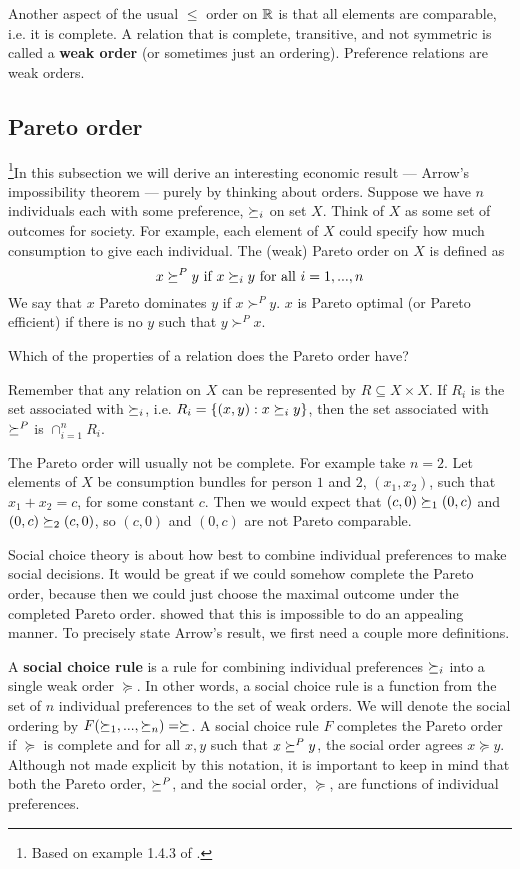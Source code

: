 Another aspect of the usual $\leq$ order on $\mathbb{R}$ is that all elements
are comparable, i.e. it is complete. A relation that is complete,
transitive, and not symmetric is called a \textbf{weak order} (or
sometimes just an ordering). Preference relations are weak orders. 

\subsection{Pareto order}

\footnote{Based on example 1.4.3 of \cite{carter2001}.}In this
subsection we will derive an interesting economic result --- Arrow's
impossibility theorem --- purely by thinking about orders.  Suppose we
have $n$ individuals each with some preference, $\succeq_i$ on set
$X$. Think of $X$ as some set of outcomes for society. For example,
each element of $X$ could specify how much consumption to give each
individual. The (weak) Pareto order on $X$ is defined as
\[ x \succeq^P y \text{ if } x \succeq_i y \text{ for all } i=1,...,n \]
We say that $x$ Pareto dominates $y$ if $x \succ^P y$. $x$ is Pareto
optimal (or Pareto efficient) if there is no $y$ such that $y \succ^P
x$. 
\begin{exercise}
  Which of the properties of a relation does the Pareto order have?
\end{exercise}
Remember that any relation on $X$ can be represented by $R \subseteq X
\times X$. If $R_i$ is the set associated with $\succeq_i$, i.e. $R_i =
\{(x,y): x \succeq_i y \}$, then the set associated with $\succeq^P$ is
$\cap_{i=1}^n R_i$. 

The Pareto order will usually not be complete. For example take
$n=2$.  Let elements of $X$ be consumption bundles for person $1$ and
$2$, $(x_1,x_2)$, such that $x_1 + x_2 = c$, for some constant
$c$. Then we would expect that $(c,0) \succeq_1 (0,c)$ and $(0,c)
\succeq_2 (c,0)$, so $(c,0)$ and $(0,c)$ are not Pareto comparable. 

Social choice theory is about how best to combine individual
preferences to make social decisions.  It would be great if we could
somehow complete the Pareto order, because then we could just choose
the maximal outcome under the completed Pareto order.
\cite{arrow1950} showed that this is impossible to do an appealing
manner. To precisely state Arrow's result, we first need a couple more
definitions. 

A \textbf{social choice rule} is a rule for combining individual
preferences $\succeq_i$ into a single weak order $\succeq$. In other
words, a social choice rule is a function from the set of $n$ individual
preferences to the set of weak orders. We will denote the social
ordering by $F(\succeq_1, ..., \succeq_n) = \succeq$. A social choice rule
$F$ completes the Pareto order if $\succeq$ is complete and for
all $x,y$ such that $x \succeq^P y$, the social order agrees $x \succeq
y$. Although not made explicit by this notation, it is important to
keep in mind that both the Pareto order, $\succeq^P$, and the social
order, $\succeq$, are functions of individual preferences. 


